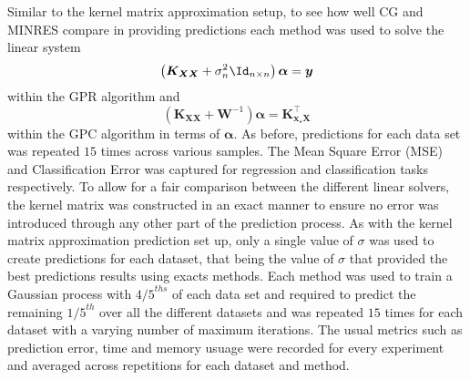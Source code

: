 Similar to the kernel matrix approximation setup, to see how well CG and MINRES compare in providing predictions each method was used to solve the linear system
\begin{equation*}
    \left( \bm{K_{XX}} + \sigma_n^2 \Id_{n \times n} \right) \bm{\alpha} = \bm{y}
\end{equation*}
within the GPR algorithm and
\begin{equation*}
    \left( \bm{K}_{\bm{X} \bm{X}} + \bm{W}^{-1} \right) \bm{\alpha} = \bm{K}_{\bm{x}_{\star} \bm{X}}^{\intercal}
\end{equation*}
within the GPC algorithm in terms of $\bm{\alpha}$. As before, predictions for each data set was repeated $15$ times across various samples. The Mean Square Error (MSE) and Classification Error was captured for regression and classification tasks respectively. To allow for a fair comparison between the different linear solvers, the kernel matrix was constructed in an exact manner to ensure no error was introduced through any other part of the prediction process. As with the kernel matrix approximation prediction set up, only a single value of $\sigma$ was used to create predictions for each dataset, that being the value of $\sigma$ that provided the best predictions results using exacts methods. Each method was used to train a Gaussian process with ${4/5}^{ths}$ of each data set and required to predict the remaining ${1/5}^{th}$ over all the different datasets and was repeated $15$ times for each dataset with a varying number of maximum iterations. The usual metrics such as prediction error, time and memory usuage were recorded for every experiment and averaged across repetitions for each dataset and method.